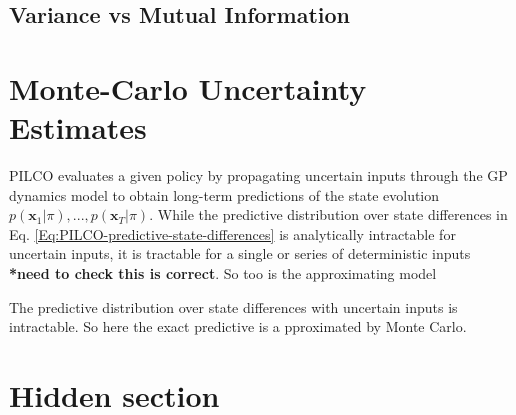\subsection{Variance vs Mutual Information}
\section{Monte-Carlo Uncertainty Estimates}

PILCO evaluates a given policy by propagating uncertain inputs through the GP dynamics model to obtain long-term predictions of the state evolution $p(\mathbf{x}_{1}|\pi),...,p(\mathbf{x}_{T}|\pi)$. While the predictive distribution over state differences in Eq. \ref{Eq:PILCO-predictive-state-differences} is analytically intractable for uncertain inputs, it is tractable for a single or series of deterministic inputs \textbf{*need to check this is correct}. So too is the approximating model 

The predictive distribution over state differences with uncertain inputs is intractable. So here the exact predictive is a pproximated by Monte Carlo.



\clearpage

\tochide\section{Hidden section}



